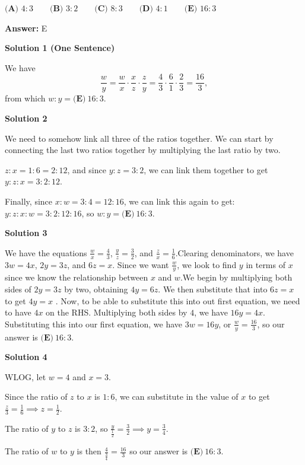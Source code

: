 \begin{enumerate}
 $\textbf{(A) }4:3 \qquad \textbf{(B) }3:2 \qquad \textbf{(C) } 8:3 \qquad \textbf{(D) } 4:1 \qquad \textbf{(E) } 16:3$

 \textbf{Answer: }E



\textbf{Solution 1 (One Sentence)}

We have 
 \[\frac wy = \frac wx \cdot \frac xz \cdot \frac zy = \frac43\cdot\frac61\cdot\frac23=\frac{16}{3},\] from which $w:y=\boxed{\textbf{(E)}\ 16:3}.$




\textbf{Solution 2}

We need to somehow link all three of the ratios together. We can start by connecting the last two ratios together by multiplying the last ratio by two. 

 $z:x=1:6=2:12$, and since $y:z=3:2$, we can link them together to get $y:z:x=3:2:12$.

 Finally, since $x:w=3:4=12:16$, we can link this again to get: $y:z:x:w=3:2:12:16$, so $w:y = \boxed{\textbf{(E)}\ 16:3}$. 

 



\textbf{Solution 3}

We have the equations $\frac{w}{x}=\frac{4}{3}$, $\frac{y}{z}=\frac{3}{2}$, and $\frac{z}{x}=\frac{1}{6}$.Clearing denominators, we have $3w = 4x$, $2y = 3z$, and $6z = x$. Since we want $\frac{w}{y}$, we look to find $y$ in terms of $x$ since we know the relationship between $x$ and $w$.We begin by multiplying both sides of $2y = 3z$ by two, obtaining $4y = 6z$. We then substitute that into $6z = x$ to get $4y = x$ . Now, to be able to substitute this into out first equation, we need to have $4x$ on the RHS. Multiplying both sides by $4$, we have $16y = 4x$. Substituting this into our first equation, we have $3w = 16y$, or $\frac{w}{y}=\frac{16}{3}$, so our answer is $\boxed{\textbf{(E)}\ 16:3}$.

 



\textbf{Solution 4}

WLOG, let $w=4$ and $x=3$. 

 Since the ratio of $z$ to $x$ is $1:6$, we can substitute in the value of $x$ to get $\frac{z}{3}=\frac{1}{6} \implies z=\frac{1}{2}$. 

 The ratio of $y$ to $z$ is $3:2$, so $\frac{y}{\frac{1}{2}}=\frac{3}{2} \implies y=\frac{3}{4}$. 

 The ratio of $w$ to $y$ is then $\frac{4}{\frac{3}{4}}=\frac{16}{3}$ so our answer is $\boxed{\textbf{(E)}\ 16:3}$. 


\end{enumerate}
